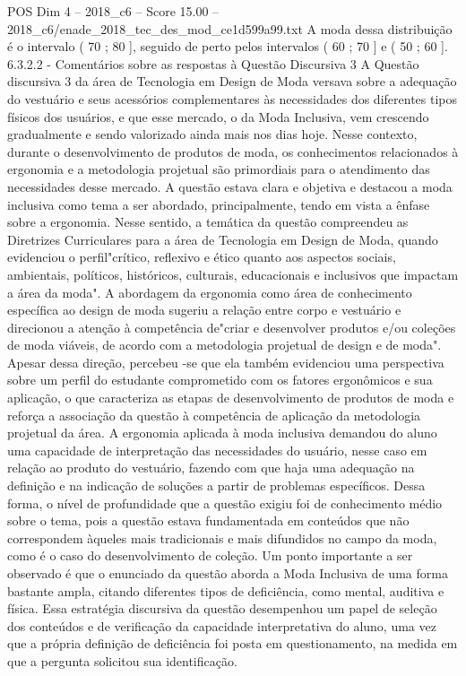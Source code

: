 \begin{textsample}{POS Dim 4 – 2018\_c6 – Score 15.00 – 2018\_c6/enade\_2018\_tec\_des\_mod\_ce1d599a99.txt}
A moda dessa distribuição é o intervalo ( 70 ; 80 ], seguido de perto pelos intervalos ( 60 ; 70 ] e ( 50 ; 60 ]. 6.3.2.2 - Comentários sobre as respostas à Questão Discursiva 3 A Questão discursiva 3 da área de Tecnologia em Design de Moda versava sobre a adequação do vestuário e seus acessórios complementares às necessidades dos diferentes tipos físicos dos usuários, e que esse mercado, o da Moda Inclusiva, vem crescendo gradualmente e sendo valorizado ainda mais nos dias hoje.
Nesse contexto, durante o desenvolvimento de produtos de moda, os conhecimentos relacionados à ergonomia e a metodologia projetual são primordiais para o atendimento das necessidades desse mercado.
A questão estava clara e objetiva e destacou a moda inclusiva como tema a ser abordado, principalmente, tendo em vista a ênfase sobre a ergonomia.
Nesse sentido, a temática da questão compreendeu as Diretrizes Curriculares para a área de Tecnologia em Design de Moda, quando evidenciou o perfil"crítico, reflexivo e ético quanto aos aspectos sociais, ambientais, políticos, históricos, culturais, educacionais e inclusivos que impactam a área da moda".
A abordagem da ergonomia como área de conhecimento específica ao design de moda sugeriu a relação entre corpo e vestuário e direcionou a atenção à competência de"criar e desenvolver produtos e/ou coleções de moda viáveis, de acordo com a metodologia projetual de design e de moda".
Apesar dessa direção, percebeu -se que ela também evidenciou uma perspectiva sobre um perfil do estudante comprometido com os fatores ergonômicos e sua aplicação, o que caracteriza as etapas de desenvolvimento de produtos de moda e reforça a associação da questão à competência de aplicação da metodologia projetual da área.
A ergonomia aplicada à moda inclusiva demandou do aluno uma capacidade de interpretação das necessidades do usuário, nesse caso em relação ao produto do vestuário, fazendo com que haja uma adequação na definição e na indicação de soluções a partir de problemas específicos.
Dessa forma, o nível de profundidade que a questão exigiu foi de conhecimento médio sobre o tema, pois a questão estava fundamentada em conteúdos que não correspondem àqueles mais tradicionais e mais difundidos no campo da moda, como é o caso do desenvolvimento de coleção.
Um ponto importante a ser observado é que o enunciado da questão aborda a Moda Inclusiva de uma forma bastante ampla, citando diferentes tipos de deficiência, como mental, auditiva e física.
Essa estratégia discursiva da questão desempenhou um papel de seleção dos conteúdos e de verificação da capacidade interpretativa do aluno, uma vez que a própria definição de deficiência foi posta em questionamento, na medida em que a pergunta solicitou sua identificação.

\end{textsample}
